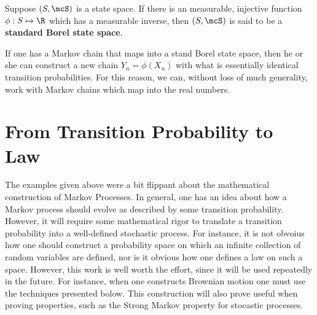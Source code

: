 \documentclass{report}
\begin{document}
\begin{definition}
Suppose $(S,\mcS)$ is a state space.  If there is an measurable, injective function $\phi : S \mapsto \R$ which has a measurable inverse, then $(S,\mcS)$ is said to be a  \textbf{standard Borel state space}.
\end{definition}

If one has a Markov chain that maps into a stand Borel state space, then he or she can construct a new chain $Y_n = \phi(X_n)$ with what is essentially identical transition probabilities.  For this reason, we can, without loss of much generality, work with Markov chains which map into the real numbers.

\section{From Transition Probability to Law}

The examples given above were a bit flippant about the mathematical construction of Markov Processes.  In general, one has an idea about how a Markov process should evolve as described by some transition probability.  However, it will require some mathematical rigor to translate a transition probability into a well-defined stochastic process.  For instance, it is not obvoius how one should construct a probability space on which an infinite collection of random variables are defined, nor is it obvious how one defines a law on such a space.  However, this work is well worth the effort, since it will be used repeatedly in the future.  For instance, when one constructs Brownian motion one must use the techniques presented bolow.  This construction will also prove useful when proving properties, such as the Strong Markov property for stocastic processes.
\end{document}
